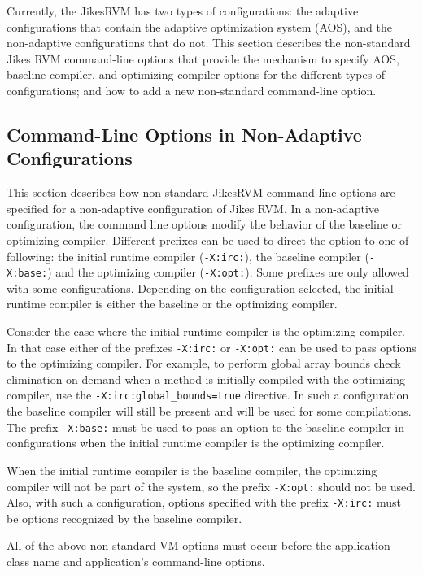 
Currently, the Jikes\trademark RVM has two types of configurations:
the adaptive configurations that contain the adaptive optimization 
system (AOS),
and the non-adaptive configurations that do not.  
This section describes the non-standard Jikes RVM command-line options that 
provide the mechanism to specify AOS, baseline compiler, and optimizing compiler options
for the different types of configurations; and 
how to add a new non-standard command-line option.

\subsection{Command-Line Options in Non-Adaptive Configurations}
\label{subsection:nonadaptive:cmdline}

This section describes how non-standard Jikes\trademark RVM command line options are 
specified for a non-adaptive configuration of Jikes RVM.
In a non-adaptive configuration, the command line options modify
the behavior of the baseline or optimizing compiler. 
Different prefixes can be used to direct the option to one of following: the initial runtime 
compiler ({\tt -X:irc:}), 
the baseline compiler ({\tt -X:base:}) and the optimizing
compiler ({\tt -X:opt:}). 
Some prefixes are only allowed with some configurations.
Depending on the configuration selected, the initial runtime compiler is 
either the baseline or the optimizing compiler. 

Consider the case where the initial runtime compiler is the optimizing 
compiler. In that case either of the 
prefixes {\tt -X:irc:} or {\tt -X:opt:} can be used to pass options to
the optimizing compiler. 
For example, to perform global array bounds check elimination on demand
when a method is initially compiled with the optimizing compiler,
use the {\tt -X:irc:global\_bounds=true} directive.
In such a configuration the baseline compiler will
still be present and will be used for some compilations. 
The prefix {\tt -X:base:} must be used to pass an option to the 
baseline compiler in configurations when the initial runtime compiler is 
the optimizing compiler.

When the initial runtime compiler is the baseline compiler, the optimizing
compiler will not be part of the system, so the prefix {\tt -X:opt:} should
not be used. Also, with such a configuration, options specified with the prefix
{\tt -X:irc:} must be options recognized by the baseline compiler.

All of the above non-standard VM options must occur before 
the application class name and application's command-line options.

